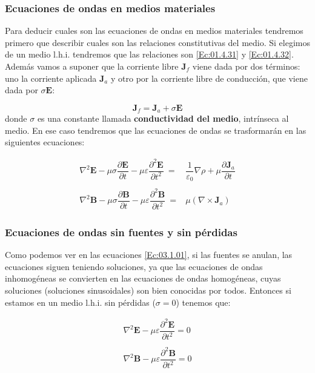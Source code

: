 \documentclass[12pt,a4paper]{article}
\newcommand{\rota}{\nabla \times}
\newcommand{\Bn}{\mathbf{B}}
\newcommand{\En}{\mathbf{E}}
\newcommand{\Jn}{\mathbf{J}}
\numberwithin{equation}{section}
\numberwithin{figure}{section}
\begin{document}
\subsubsection{Ecuaciones de ondas en medios materiales}

Para deducir cuales son las ecuaciones de ondas en medios materiales tendremos primero que describir cuales son las relaciones constitutivas del medio. Si elegimos de un medio l.h.i. tendremos que las relaciones son \ref{Ec:01.4.31} y \ref{Ec:01.4.32}. Además vamos a suponer que la corriente libre $\Jn_f$ viene dada por dos términos: uno la corriente aplicada $\Jn_a$ y otro por la corriente libre de conducción, que viene dada por $\sigma \En$:

\begin{equation}
\Jn_f = \Jn_a + \sigma \En
\end{equation}
donde $\sigma$ es  una constante llamada \textbf{conductividad del medio}, intrínseca al medio. En ese caso tendremos que las ecuaciones de ondas se trasformarán en las siguientes ecuaciones:

\begin{equation}
\begin{array}{ll}
\nabla^2 \En - \mu \sigma \dfrac{\partial \En}{\partial t} - \mu \varepsilon \dfrac{\partial^2 \En}{\partial t^2} \ =  & \dfrac{1}{\varepsilon_0} \nabla \rho + \mu \dfrac{\partial \Jn_a}{\partial t} \\ \\
\nabla^2 \Bn - \mu \sigma \dfrac{\partial \Bn}{\partial t} - \mu \varepsilon \dfrac{\partial^2 \Bn}{\partial t^2} \ =  & \mu (\rota \Jn_a)
\end{array} \label{Ec:03.1.03}
\end{equation}

\subsubsection{Ecuaciones de ondas sin fuentes y sin pérdidas}

Como podemos ver en las ecuaciones \ref{Ec:03.1.01}, si las fuentes se anulan, las ecuaciones siguen teniendo soluciones, ya que las ecuaciones de ondas inhomogéneas se convierten en las ecuaciones de ondas homogéneas, cuyas soluciones (soluciones sinusoidales) son bien conocidas por todos. Entonces si estamos en un medio l.h.i. sin pérdidas ($\sigma = 0$) tenemos que: 


\begin{equation}
\begin{array}{l}
\nabla^2 \En - \mu \varepsilon \dfrac{\partial^2 \En}{\partial t^2} =0 \\ \\
\nabla^2 \Bn - \mu \varepsilon \dfrac{\partial^2 \Bn}{\partial t^2} = 0  
\end{array} \label{Ec:03.1.04}
\end{equation} 
\end{document}
